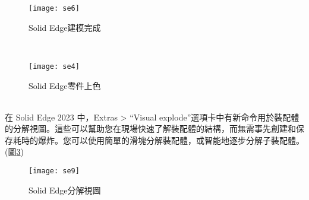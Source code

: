 \begin{figure}[hbt!]
\begin{center}
\texttt{[image: se6]}
\caption{\Large Solid Edge建模完成}\label{3.24}
\end{center}
\end{figure}
\\
\begin{figure}[hbt!]
\begin{center}
\texttt{[image: se4]}
\caption{\Large Solid Edge零件上色}\label{3.25}
\end{center}
\end{figure}
\\
在 Solid Edge 2023 中，Extras > “Visual explode”選項卡中有新命令用於裝配體的分解視圖。這些可以幫助您在現場快速了解裝配體的結構，而無需事先創建和保存耗時的爆炸。您可以使用簡單的滑塊分解裝配體，或智能地逐步分解子裝配體。(圖\ref{3.26})\\
\begin{figure}[hbt!]
\begin{center}
\texttt{[image: se9]}
\caption{\Large Solid Edge分解視圖}\label{3.26}
\end{center}
\end{figure}
\\

\newpage

